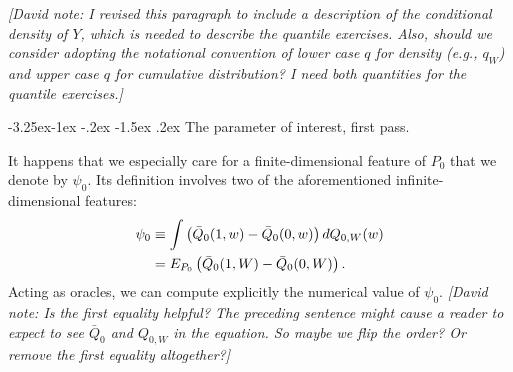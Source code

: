\documentclass[]{article}
\makeatletter
\newenvironment{Shaded}{\begin{snugshade}}{\end{snugshade}}
\newcommand{\ControlFlowTok}[1]{\textcolor[rgb]{0.13,0.29,0.53}{\textbf{#1}}}
\newcommand{\DataTypeTok}[1]{\textcolor[rgb]{0.13,0.29,0.53}{#1}}
\newcommand{\DecValTok}[1]{\textcolor[rgb]{0.00,0.00,0.81}{#1}}
\newcommand{\KeywordTok}[1]{\textcolor[rgb]{0.13,0.29,0.53}{\textbf{#1}}}
\newcommand{\NormalTok}[1]{#1}
\newcommand{\OperatorTok}[1]{\textcolor[rgb]{0.81,0.36,0.00}{\textbf{#1}}}
\newcommand{\StringTok}[1]{\textcolor[rgb]{0.31,0.60,0.02}{#1}}
\renewcommand\subsection{\@startsection{subsection}{3}{\z@}%
                                     {-3.25ex\@plus -1ex \@minus -.2ex}%
                                     {-1.5ex \@plus .2ex}%
                                     {\normalfont\normalsize\bfseries}}
\newcommand{\Qbar}{\bar{Q}}
\theoremstyle{definition}
\theoremstyle{definition}
\theoremstyle{definition}
\theoremstyle{remark}
\makeatother
\begin{document}
\emph{{[}David note: I revised this paragraph to include a description
of the conditional density of \(Y\), which is needed to describe the
quantile exercises. Also, should we consider adopting the notational
convention of lower case \(q\) for density (e.g., \(q_W\)) and upper
case \(q\) for cumulative distribution? I need both quantities for the
quantile exercises.{]}}

\subsection{The parameter of interest, first pass.}
\label{subsec:parameter:first}

It happens that we especially care for a finite-dimensional feature of
\(P_{0}\) that we denote by \(\psi_{0}\). Its definition involves two of
the aforementioned infinite-dimensional features:
\begin{align}  \label{eq:psi0}
\psi_{0}  &\equiv   \int  \left(\Qbar_{0}(1,   w)  -   \Qbar_{0}(0,  w)\right)
dQ_{0,W}(w)\\  \notag  &=  E_{P_{0}}   \left(\Qbar_{0}(1,  W)  -  \Qbar_{0}(0,
W)\right).   \end{align} Acting as oracles, we can compute explicitly
the numerical value of \(\psi_{0}\). \emph{{[}David note: Is the first
equality helpful? The preceding sentence might cause a reader to expect
to see \(\Qbar_0\) and \(Q_{0,W}\) in the equation. So maybe we flip the
order? Or remove the first equality altogether?{]}}

\begin{Shaded}
\end{Shaded}
\end{document}
